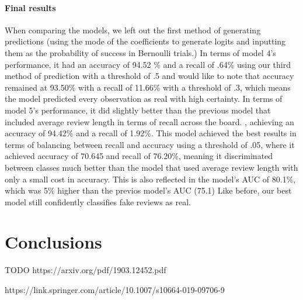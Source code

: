 \documentclass[man, floatsintext, 10pt]{apa6}
\begin{document}
\paragraph{Final results} When comparing the models, we left out the first method of generating predictions (using the mode of the coefficients to generate logits and inputting them as the probability of success in Bernoulli trials.)  In terms of model 4's performance, it  had an accuracy of 94.52 \% and a recall of .64\% using our third method of prediction with a threshold of .5 and would like to note that accuracy remained at 93.50\%  with a recall of 11.66\% with a threshold of .3, which means the model predicted every observation as real with high certainty. In terms of model 5's performance, it did slightly better than the previous model that included average review length in terms of recall across the board. , achieving an accuracy of 94.42\% and a recall of 1.92\%. This model achieved the best results in terms of balancing between recall and accuracy using a threshold of .05, where it achieved accuracy of  70.645 and recall of 76.20\%, meaning it discriminated between classes much better than the model that used average review length with only a small cost in accuracy.  This is also reflected in the model's AUC of 80.1\%, which was 5\% higher than the previos model's AUC (75.1) Like before, our best model still confidently classifies fake reviews as real.

\section{Conclusions} 

TODO https://arxiv.org/pdf/1903.12452.pdf

https://link.springer.com/article/10.1007/s10664-019-09706-9
\end{document}
